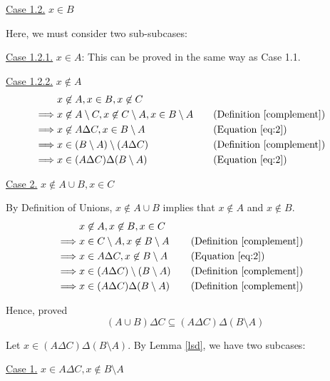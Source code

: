 \begin{enumerate}
\begin{named}[Part 1]
			\underline{Case 1.2.} $x \in B$

			Here, we must consider two sub-subcases:

			\underline{Case 1.2.1.} $x \in A$: This can be proved in the same way as Case 1.1.

			\underline{Case 1.2.2.} $x \not\in A$
			\begin{align*}
				& x \not\in A, x \in B, x \not\in C \\
				\implies & x \not\in A \setminus C, x \not\in C \setminus A, x \in B \setminus A 
								 && \quad \text{(Definition \ref{complement})} \\
				\implies & x \not\in A \Delta C, x \in B \setminus A
					&& \quad \text{(Equation \ref{eq:2})} \\
				\implies & x \in (B \setminus A) \setminus (A \Delta C)
								 && \quad \text{(Definition \ref{complement})} \\
				\implies & x \in (A \Delta C) \Delta (B \setminus A)
					&& \quad \text{(Equation \ref{eq:2})}
			\end{align*}

			\underline{Case 2.} $x \not\in A \cup B, x \in C$

			By Definition of Unions, $x \not\in A \cup B$ implies that $x \not\in A$ and $x \not\in B$.
			\begin{align*}
				& x \not\in A, x \not\in B, x \in C \\
				\implies & x \in C \setminus A, x \not\in B \setminus A 
								 && \quad \text{(Definition \ref{complement})} \\
				\implies & x \in A \Delta C, x \not\in B \setminus A
								 && \quad \text{(Equation \ref{eq:2})} \\
				\implies & x \in (A \Delta C) \setminus (B \setminus A)
								 && \quad \text{(Definition \ref{complement})} \\
				\implies & x \in (A \Delta C) \Delta (B \setminus A)
								 && \quad \text{(Definition \ref{complement})}
			\end{align*}

			Hence, proved $$(A\cup B) \Delta C \subseteq (A \Delta C) \Delta (B \setminus A)$$
		\end{named}
		\begin{named}[Part 2]
			Let $x \in (A \Delta C) \Delta (B \setminus A)$. By Lemma \ref{lsd}, we have two subcases:

			\underline{Case 1.} $x \in A \Delta C, x \not\in B \setminus A$


\end{named}
\end{enumerate}
